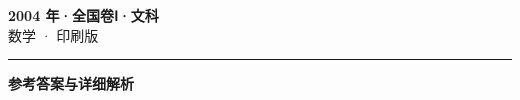 \documentclass[zihao=5, a4paper]{ctexart}
\begin{document}
\begin{center}
  {\Large\bfseries 2004 年·全国卷Ⅰ·文科}\\[4pt]
  {\large 数学 · 印刷版}
\end{center}
\medskip
{}

\par\bigskip\hrule\bigskip
{}
\begin{center}{\large\bfseries 参考答案与详细解析}\end{center}
\smallskip

\end{document}
